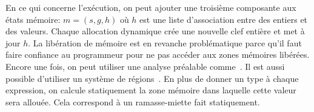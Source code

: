 En ce qui concerne l'exécution, on peut ajouter une troisième composante aux
états mémoire: $m = (s, g, h)$ où $h$ est une liste d'association entre des
entiers et des valeurs. Chaque allocation dynamique crée une nouvelle clef
entière et met à jour $h$. La libération de mémoire est en revanche
problématique parce qu'il faut faire confiance au programmeur pour ne pas
accéder aux zones mémoires libérées. Encore une fois, on peut utiliser une
analyse préalable comme~\cite{ifm10}. Il est aussi possible d'utiliser un système de
régions~\cite{jfp92}. En plus de donner un type à chaque expression, on calcule
statiquement la zone mémoire dans laquelle cette valeur sera allouée. Cela
correspond à un ramasse-miette fait statiquement.




